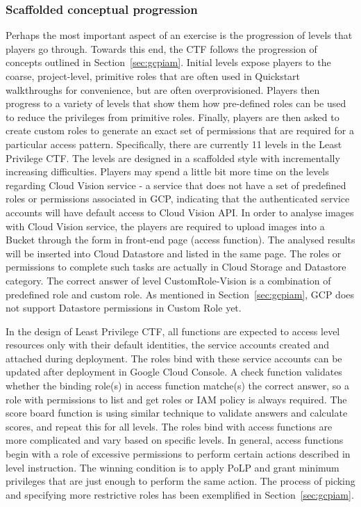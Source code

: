 \subsubsection{Scaffolded conceptual progression}
Perhaps the most important aspect of an exercise is the progression of levels that players go through.  Towards this end, the CTF follows the progression
of concepts outlined in Section~\ref{sec:gcpiam}.  Initial levels expose players to the coarse, project-level, primitive roles that are often used in Quickstart
walkthroughs for convenience, but are often overprovisioned.  Players then progress to a variety of levels that show them how pre-defined roles can be used
to reduce the privileges from primitive roles.   Finally, players are then asked to create custom roles to generate an exact set of permissions that are
required for a particular access pattern.
Specifically, there are currently 11 levels in the Least Privilege CTF.  The levels are designed in a scaffolded style with incrementally increasing difficulties. 
Players may spend a little bit more time on the levels regarding Cloud Vision service - a service that does not have a set of predefined roles or permissions associated in GCP, indicating that the authenticated service accounts will have default access to Cloud Vision API. In order to analyse images with Cloud Vision service, the players are required to upload images into a Bucket through the form in front-end page (access function). The analysed results will be inserted into Cloud Datastore and listed in the same page.  The roles or permissions to complete such tasks are actually in Cloud Storage and Datastore category. The correct answer of level CustomRole-Vision is a combination of predefined role and custom role. As mentioned in Section~\ref{sec:gcpiam}, GCP does not support Datastore permissions in Custom Role yet.


In the design of Least Privilege CTF, all functions are expected to access level resources only with their default identities, the service accounts created and attached during deployment. The roles bind with these service accounts can be updated after deployment in Google Cloud Console. 
A check function validates whether the binding role(s) in access function matche(s) the correct answer, so a role with permissions to list and get roles or IAM policy is always required. The score board function is using similar technique to validate answers and calculate scores, and repeat this for all levels. The roles bind with access functions are more complicated and vary based on specific levels. In general, access functions begin with a role of excessive permissions to perform certain actions described in level instruction. The winning condition is to apply PoLP and grant minimum privileges that are just enough to perform the same action. The process of picking and specifying more restrictive roles has been exemplified in Section~\ref{sec:gcpiam}.

